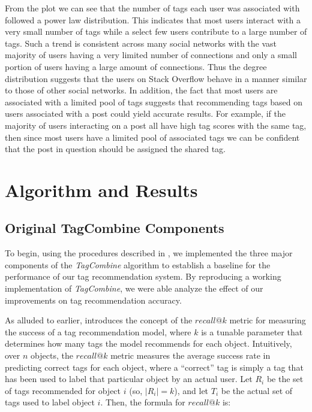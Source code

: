 \documentclass[11pt]{IEEEtran}
\begin{document}
From the plot we can see that the number of tags each user was associated with followed a power law distribution. This indicates that most users interact with a very small number of tags while a select few users contribute to a large number of tags. Such a trend is consistent across many social networks with the vast majority of users having a very limited number of connections and only a small portion of users having a large amount of connections. Thus the degree distribution suggests that the users on Stack Overflow behave in a manner similar to those of other social networks. In addition, the fact that most users are associated with a limited pool of tags suggests that recommending tags based on users associated with a post could yield accurate results. For example, if the majority of users interacting on a post all have high tag scores with the same tag, then since most users have a limited pool of associated tags we can be confident that the post in question should be assigned the shared tag.

\section{Algorithm and Results}

\subsection{Original TagCombine Components}

To begin, using the procedures described in \cite{1}, we implemented the three major components of the \textit{TagCombine} algorithm to establish a baseline for the performance of our tag recommendation system. By reproducing a working implementation of \textit{TagCombine}, we were able analyze the effect of our improvements on tag recommendation accuracy.

As alluded to earlier, \cite{1} introduces the concept of the $recall@k$ metric for measuring the success of a tag recommendation model, where $k$ is a tunable parameter that determines how many tags the model recommends for each object. Intuitively, over $n$ objects, the $recall@k$ metric measures the average success rate in predicting correct tags for each object, where a ``correct'' tag is simply a tag that has been used to label that particular object by an actual user. Let $R_i$ be the set of tags recommended for object $i$ (so, $|R_i| = k$), and let $T_i$ be the actual set of tags used to label object $i$. Then, the formula for $recall@k$ is:
\end{document}
